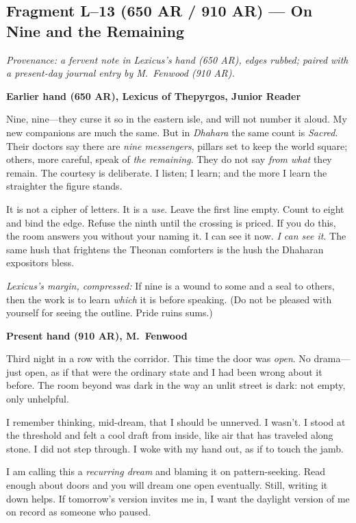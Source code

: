 \documentclass[11pt]{article}
\begin{document}
\subsection{Fragment L--13 (650 AR / 910 AR) --- On Nine and the Remaining}
\label{frag:l13}
{}

\noindent\textit{Provenance: a fervent note in Lexicus’s hand (650 AR), edges rubbed; paired with a present-day journal entry by M.\ Fenwood (910 AR).}

\medskip
\noindent\textbf{Earlier hand (650 AR), Lexicus of Thepyrgos, Junior Reader}

Nine, nine—they curse it so in the eastern isle, and will not number it aloud. My new companions are much the same. But in \textit{Dhahara} the same count is \emph{Sacred}. Their doctors say there are \emph{nine messengers}, pillars set to keep the world square; others, more careful, speak of \emph{the remaining}. They do not say \emph{from what} they remain. The courtesy is deliberate. I listen; I learn; and the more I learn the straighter the figure stands.

It is not a cipher of letters. It is a \emph{use}. Leave the first line empty. Count to eight and bind the edge. Refuse the ninth until the crossing is priced. If you do this, the room answers you without your naming it. I can see it now. \emph{I can see it}. The same hush that frightens the Theonan comforters is the hush the Dhaharan expositors bless.

\medskip
\noindent\textit{Lexicus’s margin, compressed:} If nine is a wound to some and a seal to others, then the work is to learn \emph{which} it is before speaking. (Do not be pleased with yourself for seeing the outline. Pride ruins sums.)

\medskip
\noindent\textbf{Present hand (910 AR), M.\ Fenwood}

Third night in a row with the corridor. This time the door was \emph{open}. No drama—just open, as if that were the ordinary state and I had been wrong about it before. The room beyond was dark in the way an unlit street is dark: not empty, only unhelpful.

I remember thinking, mid-dream, that I should be unnerved. I wasn’t. I stood at the threshold and felt a cool draft from inside, like air that has traveled along stone. I did not step through. I woke with my hand out, as if to touch the jamb.

I am calling this a \emph{recurring dream} and blaming it on pattern-seeking. Read enough about doors and you will dream one open eventually. Still, writing it down helps. If tomorrow’s version invites me in, I want the daylight version of me on record as someone who paused.
\end{document}
